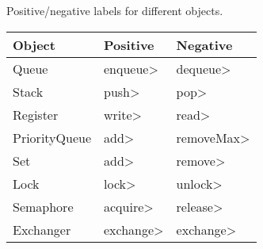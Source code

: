 
\newcommand{\domain}{\mathbb{D}}


\begin{example}

Positive/negative labels for different objects.\\

\begin{tabular}{l | l | l}
Object &  Positive & Negative \\\hline
Queue & \<enqueue> & \<dequeue> \\
Stack & \<push> & \<pop> \\
Register & \<write> & \<read> \\
PriorityQueue & \<add> & \<removeMax> \\
Set & \<add> & \<remove> \\
Lock & \<lock> & \<unlock> \\
Semaphore & \<acquire> & \<release> \\
Exchanger & \<exchange> & \<exchange>\\
\end{tabular}

\end{example}

